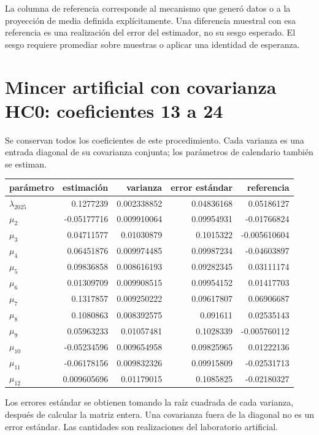 \documentclass[11pt,a4paper]{article}
\begin{document}
La columna de referencia corresponde al mecanismo que generó datos o a la proyección de media definida explícitamente. Una diferencia muestral con esa referencia es una realización del error del estimador, no su sesgo esperado. El sesgo requiere promediar sobre muestras o aplicar una identidad de esperanza.

\clearpage
\section{Mincer artificial con covarianza HC0: coeficientes 13 a 24}
Se conservan todos los coeficientes de este procedimiento. Cada varianza es una entrada diagonal de su covarianza conjunta; los parámetros de calendario también se estiman.
\begin{center}\small
\begin{tabular}{lrrrr}
\toprule
parámetro & estimación & varianza & error estándar & referencia\\\midrule
$\lambda_{2025}$ & 0.1277239 & 0.002338852 & 0.04836168 & 0.05186127\\
$\mu_2$ & -0.05177716 & 0.009910064 & 0.09954931 & -0.01766824\\
$\mu_3$ & 0.04711577 & 0.01030879 & 0.1015322 & -0.005610604\\
$\mu_4$ & 0.06451876 & 0.009974485 & 0.09987234 & -0.04603897\\
$\mu_5$ & 0.09836858 & 0.008616193 & 0.09282345 & 0.03111174\\
$\mu_6$ & 0.01309709 & 0.009908515 & 0.09954152 & 0.01417703\\
$\mu_7$ & 0.1317857 & 0.009250222 & 0.09617807 & 0.06906687\\
$\mu_8$ & 0.1080863 & 0.008392575 & 0.091611 & 0.02535143\\
$\mu_9$ & 0.05963233 & 0.01057481 & 0.1028339 & -0.005760112\\
$\mu_10$ & -0.05234596 & 0.009654958 & 0.09825965 & 0.01222136\\
$\mu_11$ & -0.06178156 & 0.009832326 & 0.09915809 & -0.02531713\\
$\mu_12$ & 0.009605696 & 0.01179015 & 0.1085825 & -0.02180327\\
\bottomrule
\end{tabular}\end{center}

Los errores estándar se obtienen tomando la raíz cuadrada de cada varianza, después de calcular la matriz entera. Una covarianza fuera de la diagonal no es un error estándar. Las cantidades son realizaciones del laboratorio artificial.
\end{document}
